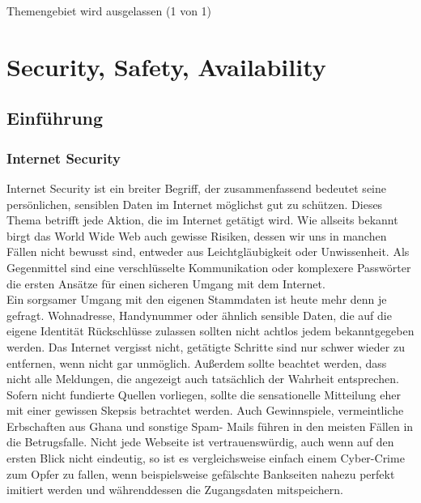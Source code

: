\documentclass[letterpaper, 12pt]{article}
\let\tempsection\section
\renewcommand\section[1]{\vspace{-0.3cm}\tempsection{#1}\vspace{-0.3cm}}
\let\tempsubsection\subsection
\renewcommand\subsection[1]{\vspace{0cm}\tempsubsection{#1}\vspace{0cm}}
\let\tempsubsubsection\subsubsection
\renewcommand\subsubsection[1]{\vspace{0cm}\tempsubsubsection{#1}\vspace{0cm}}
\begin{document}
Themengebiet wird ausgelassen (1 von 1)

\clearpage

\section{Security, Safety, Availability}

\subsection{Einführung}

\subsubsection{Internet Security}

Internet Security ist ein breiter Begriff, der zusammenfassend bedeutet seine persönlichen, sensiblen
Daten im Internet möglichst gut zu schützen. Dieses Thema betrifft jede Aktion, die im Internet
getätigt wird. Wie allseits bekannt birgt das World Wide Web auch gewisse Risiken, dessen wir uns in
manchen Fällen nicht bewusst sind, entweder aus Leichtgläubigkeit oder Unwissenheit. Als
Gegenmittel sind eine verschlüsselte Kommunikation oder komplexere Passwörter die ersten
Ansätze für einen sicheren Umgang mit dem Internet. \\
Ein sorgsamer Umgang mit den eigenen Stammdaten ist heute mehr denn je gefragt. Wohnadresse,
Handynummer oder ähnlich sensible Daten, die auf die eigene Identität Rückschlüsse zulassen sollten
nicht achtlos jedem bekanntgegeben werden. Das Internet vergisst nicht, getätigte Schritte sind nur
schwer wieder zu entfernen, wenn nicht gar unmöglich. Außerdem sollte beachtet werden, dass
nicht alle Meldungen, die angezeigt auch tatsächlich der Wahrheit entsprechen. Sofern nicht
fundierte Quellen vorliegen, sollte die sensationelle Mitteilung eher mit einer gewissen Skepsis
betrachtet werden. Auch Gewinnspiele, vermeintliche Erbschaften aus Ghana und sonstige Spam-
Mails führen in den meisten Fällen in die Betrugsfalle. Nicht jede Webseite ist vertrauenswürdig,
auch wenn auf den ersten Blick nicht eindeutig, so ist es vergleichsweise einfach einem Cyber-Crime
zum Opfer zu fallen, wenn beispielsweise gefälschte Bankseiten nahezu perfekt imitiert werden und
währenddessen die Zugangsdaten mitspeichern. \cite{ausarbeitung}
\end{document}
